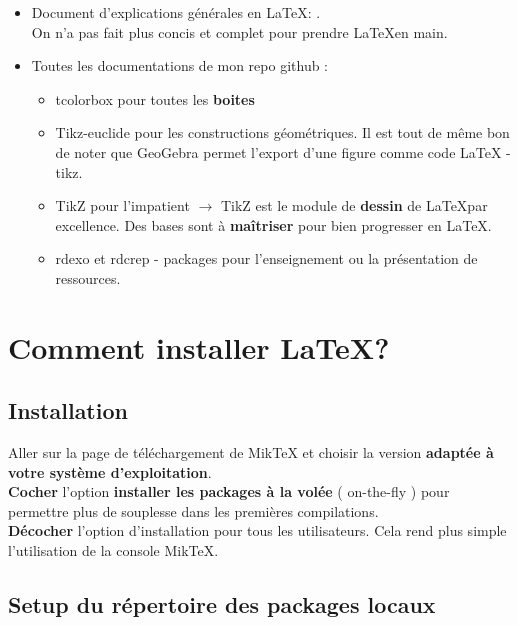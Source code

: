 \begin{itemize}[label=\bccrayon]

	\item Document d'explications générales en \LaTeX : .\\On n'a pas fait plus concis et complet pour prendre \LaTeX en main.
	\item Toutes les documentations de mon repo github : \\
		\begin{itemize}[label=\faPen]
			\item tcolorbox pour toutes les \textbf{boites} 
			\item Tikz-euclide pour les constructions géométriques. Il est tout de même bon de noter que GeoGebra permet l'export d'une figure comme code LaTeX - tikz.
			\item TikZ pour l'impatient $\longrightarrow$ TikZ est le module de \textbf{dessin} de \LaTeX par excellence. Des bases sont à \textbf{maîtriser} pour bien progresser en \LaTeX. 
			\item rdexo et rdcrep - packages pour l'enseignement ou la présentation de ressources. 
		\end{itemize}
	
\end{itemize}	

\section{Comment installer \LaTeX ?}

\subsection{Installation}

Aller sur la page de téléchargement de MikTeX et choisir la version \textbf{adaptée à votre système d'exploitation}.\\
\textbf{Cocher} l'option \textbf{installer les packages à la volée} ( on-the-fly ) pour permettre plus de souplesse dans les premières compilations.\\
\textbf{Décocher} l'option d'installation pour tous les utilisateurs. Cela rend plus simple l'utilisation de la console MikTeX.


\subsection{Setup du répertoire des packages locaux}

